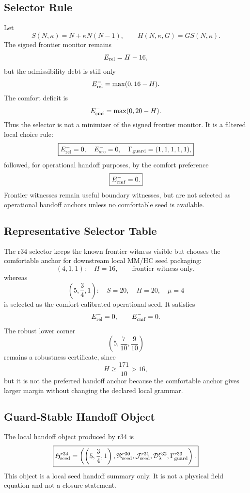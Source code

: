 \subsection{Selector Rule}
\label{subsec:r34-selector-rule}

Let
\[
S(N,\kappa)=N+\kappa N(N-1),
\qquad
H(N,\kappa,G)=G S(N,\kappa).
\]
The signed frontier monitor remains
\[
E_{\rm rel}=H-16,
\]
but the admissibility debt is still only
\[
E_{\rm rel}^{-}=\max(0,16-H).
\]
The comfort deficit is
\[
E_{\rm cmf}^{-}=\max(0,20-H).
\]
Thus the selector is not a minimizer of the signed frontier monitor.  It is a
filtered local choice rule:
\[
\boxed{
E_{\rm rel}^{-}=0,
\quad
E_{\rm src}^{-}=0,
\quad
\Gamma_{\rm guard}=(1,1,1,1,1),
}
\]
followed, for operational handoff purposes, by the comfort preference
\[
\boxed{
E_{\rm cmf}^{-}=0.
}
\]
Frontier witnesses remain useful boundary witnesses, but are not selected as
operational handoff anchors unless no comfortable seed is available.

\subsection{Representative Selector Table}
\label{subsec:r34-representative-selector-table}

The r34 selector keeps the known frontier witness visible but chooses the
comfortable anchor for downstream local MM/HC seed packaging:
\[
(4,1,1):\quad H=16,
\qquad
\text{frontier witness only},
\]
whereas
\[
\boxed{
\left(5,\frac34,1\right):\quad S=20,
\quad H=20,
\quad \mu=4
}
\]
is selected as the comfort-calibrated operational seed.  It satisfies
\[
E_{\rm rel}^{-}=0,
\qquad
E_{\rm cmf}^{-}=0.
\]
The robust lower corner
\[
\left(5,\frac7{10},\frac9{10}\right)
\]
remains a robustness certificate, since
\[
H\geq\frac{171}{10}>16,
\]
but it is not the preferred handoff anchor because the comfortable anchor gives
larger margin without changing the declared local grammar.

\subsection{Guard-Stable Handoff Object}
\label{subsec:r34-guard-stable-handoff-object}

The local handoff object produced by r34 is
\[
\boxed{
\mathfrak H_{\rm seed}^{r34}
=
\left(
\left(5,\frac34,1\right),
\mathfrak N_{\rm seed}^{r30},
\mathcal J_{\rm seed}^{r31},
\mathcal D_{\lambda}^{r32},
\Gamma_{\rm guard}^{r33}
\right).
}
\]
This object is a local seed handoff summary only.  It is not a physical field
equation and not a closure statement.

